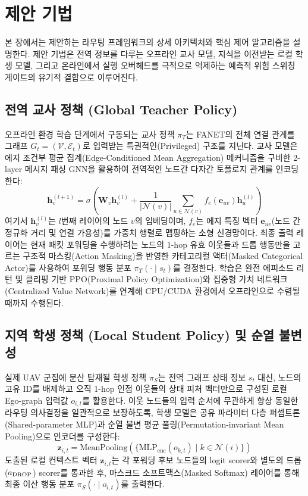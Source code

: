 \section{제안 기법}
\label{sec:제안기법}

본 장에서는 제안하는 \method{} 라우팅 프레임워크의 상세 아키텍처와 핵심 제어 알고리즘을 설명한다. 제안 기법은 전역 정보를 다루는 오프라인 교사 모델, 지식을 이전받는 로컬 학생 모델, 그리고 온라인에서 실행 오버헤드를 극적으로 억제하는 예측적 위험 스위칭 게이트의 유기적 결합으로 이루어진다.

\subsection{전역 교사 정책 (Global Teacher Policy)}
오프라인 환경 학습 단계에서 구동되는 교사 정책 $\pi_T$는 FANET의 전체 연결 관계를 그래프 $G_t = (\mathcal{V}, \mathcal{E}_t)$로 입력받는 특권적인(Privileged) 구조를 지닌다. 교사 모델은 에지 조건부 평균 집계(Edge-Conditioned Mean Aggregation) 메커니즘을 구비한 2-layer 메시지 패싱 GNN을 활용하여 전역적인 노드간 다자간 토폴로지 관계를 인코딩한다:
\[
\mathbf{h}_v^{(l+1)} = \sigma \left( \mathbf{W}_v \mathbf{h}_v^{(l)} + \frac{1}{|\mathcal{N}(v)|} \sum_{u \in \mathcal{N}(v)} f_e (\mathbf{e}_{uv}) \mathbf{h}_u^{(l)} \right)
\]
여기서 $\mathbf{h}_v^{(l)}$는 $l$번째 레이어의 노드 $v$의 임베딩이며, $f_e$는 에지 특징 벡터 $\mathbf{e}_{uv}$(노드 간 정규화 거리 및 연결 가용성)를 가중치 행렬로 맵핑하는 소형 신경망이다. 
최종 출력 레이어는 현재 패킷 포워딩을 수행하려는 노드의 1-hop 유효 이웃들과 드롭 행동만을 고르는 구조적 마스킹(Action Masking)을 반영한 카테고리컬 액터(Masked Categorical Actor)를 사용하여 포워딩 행동 분포 $\pi_T(\cdot \mid s_t)$를 결정한다. 학습은 완전 에피소드 리턴 및 클리핑 기반 PPO(Proximal Policy Optimization)\cite{schulman2017ppo}와 집중형 가치 네트워크(Centralized Value Network)를 연계해 CPU/CUDA 환경에서 오프라인으로 수렴될 때까지 수행된다.

\subsection{지역 학생 정책 (Local Student Policy) 및 순열 불변성}
실제 UAV 군집에 분산 탑재될 학생 정책 $\pi_S$는 전역 그래프 상태 정보 $s_t$ 대신, 노드의 고유 ID를 배제하고 오직 1-hop 인접 이웃들의 상태 피처 벡터만으로 구성된 로컬 Ego-graph 입력값 $o_{i,t}$를 활용한다. 이웃 노드들의 입력 순서에 무관하게 항상 동일한 라우팅 의사결정을 일관적으로 보장하도록, 학생 모델은 공유 파라미터 다층 퍼셉트론(Shared-parameter MLP)과 순열 불변 평균 풀링(Permutation-invariant Mean Pooling)으로 인코더를 구성한다:
\[
\mathbf{z}_{i,t} = \mathrm{MeanPooling} \left( \{ \mathrm{MLP}_{\mathrm{enc}}(o_{k,t}) \mid k \in \mathcal{N}(i) \} \right)
\]
도출된 로컬 컨텍스트 벡터 $\mathbf{z}_{i,t}$는 각 포워딩 후보 노드들의 logit scorer와 별도의 드롭($a_{\mathrm{DROP}}$) scorer를 통과한 후, 마스크드 소프트맥스(Masked Softmax) 레이어를 통해 최종 이산 행동 분포 $\pi_S(\cdot \mid o_{i,t})$를 출력한다.

